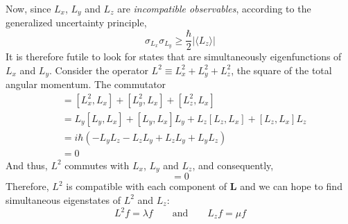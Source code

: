 Now, since $L_x$, $L_y$ and $L_z$ are \textit{incompatible observables}, according to the generalized uncertainty principle, 
\begin{equation*}
    \sigma_{L_x}\sigma_{L_y}\ge\frac{\hbar}{2}|\langle L_z\rangle|
\end{equation*}
It is therefore futile to look for states that are simultaneously eigenfunctions of $L_x$ and $L_y$. Consider the operator $L^2 \equiv L_x^2 + L_y^2 + L_z^2$, the square of the total angular momentum. The commutator 
\begin{align*}
    [L^2, L_x] &= [L_x^2, L_x] + [L_y^2, L_x] + [L_z^2, L_x]\\
    &= L_y[L_y, L_x] + [L_y, L_x]L_y + L_z[L_z, L_x] + [L_z, L_x]L_z\\
    &= i\hbar(-L_yL_z - L_zL_y + L_zL_y + L_yL_z)\\
    &= 0
\end{align*}
And thus, $L^2$ commutes with $L_x$, $L_y$ and $L_z$, and consequently, 
\begin{equation*}
    [L^2, \mathbf{L}] = 0
\end{equation*}
Therefore, $L^2$ is compatible with each component of $\mathbf{L}$ and we can hope to find simultaneous eigenstates of $L^2$ and $L_z$:
\begin{equation*}
    L^2f = \lambda f\qquad\text{and}\qquad L_zf = \mu f
\end{equation*}